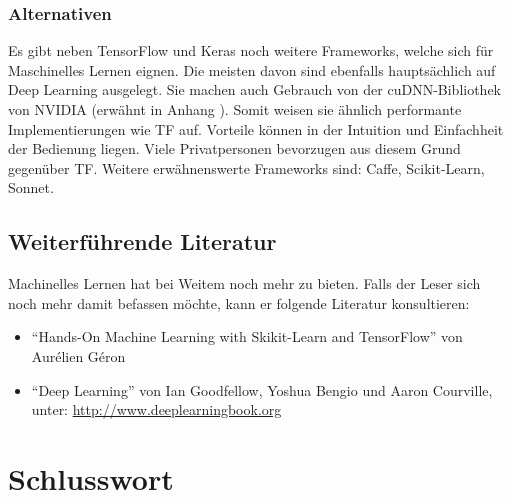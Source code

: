 \subsection*{Alternativen}
Es gibt neben TensorFlow und Keras noch weitere Frameworks, welche sich für
Maschinelles Lernen eignen. Die meisten davon sind ebenfalls hauptsächlich auf Deep
Learning ausgelegt. Sie machen auch Gebrauch von der cuDNN-Bibliothek
von NVIDIA (erwähnt in Anhang ). Somit weisen sie
ähnlich performante Implementierungen wie TF auf. Vorteile können in der
Intuition und Einfachheit der Bedienung liegen. Viele Privatpersonen bevorzugen
aus diesem Grund  gegenüber TF.
Weitere erwähnenswerte Frameworks sind: Caffe, Scikit-Learn, Sonnet.

\section*{Weiterführende Literatur}
Machinelles Lernen hat bei Weitem noch mehr zu bieten. Falls der Leser sich noch
mehr damit befassen möchte, kann er folgende Literatur konsultieren:
\begin{itemize}
\item{``Hands-On Machine Learning with Skikit-Learn and TensorFlow'' von Aurélien Géron}
  \item{``Deep Learning'' von Ian Goodfellow, Yoshua Bengio und Aaron Courville,
      unter: \url{http://www.deeplearningbook.org}}
\end{itemize}


\chapter*{Schlusswort}


